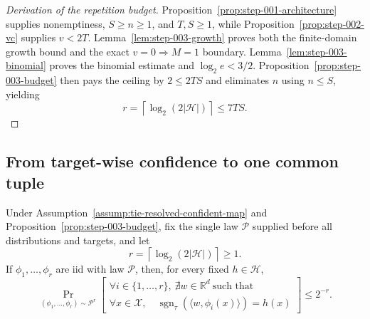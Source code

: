 \begin{proof}[Derivation of the repetition budget]
Proposition~\ref{prop:step-001-architecture} supplies nonemptiness,
$S\geq n\geq1$, and $T,S\geq1$, while
Proposition~\ref{prop:step-002-vc} supplies $v<2T$.
Lemma~\ref{lem:step-003-growth} proves both the finite-domain growth bound and
the exact $v=0\Rightarrow M=1$ boundary.  Lemma~\ref{lem:step-003-binomial}
proves the binomial estimate and $\log_2e<3/2$.
Proposition~\ref{prop:step-003-budget} then pays the ceiling by
$2\leq2TS$ and eliminates $n$ using $n\leq S$, yielding
\[
r=\left\lceil\log_2(2|\mathcal H|)\right\rceil\leq7TS.
\]
\end{proof}

\subsection{From target-wise confidence to one common tuple}
\label{app:step-004}

\begin{lemma}
\label{lem:step-004-single-target}
Under Assumption~\ref{assump:tie-resolved-confident-map} and
Proposition~\ref{prop:step-003-budget}, fix the single law $\mathcal P$
supplied before all distributions and targets, and let
\[
r=\left\lceil\log_2(2|\mathcal H|)\right\rceil\geq1.
\]
If $\phi_1,\ldots,\phi_r$ are iid with law $\mathcal P$, then, for every
fixed $h\in\mathcal H$,
\[
\Pr_{(\phi_1,\ldots,\phi_r)\sim\mathcal P^r}
\!\left[
\begin{array}{c}
\forall i\in\{1,\ldots,r\},\ \nexists w\in\mathbb R^d\ \text{such that}\\
\forall x\in\mathcal X,\quad
\operatorname{sgn}_{\tau}(\langle w,\phi_i(x)\rangle)=h(x)
\end{array}
\right]
\leq2^{-r}.
\]
\end{lemma}

